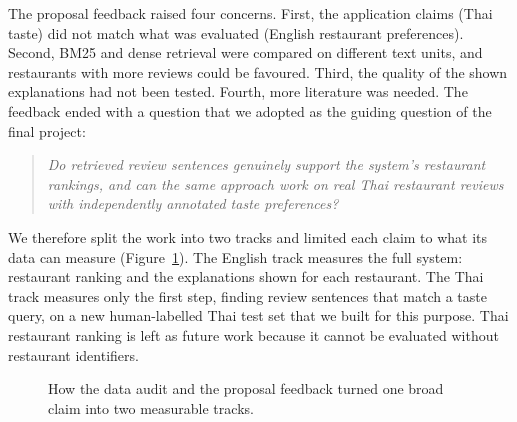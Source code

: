The proposal feedback raised four concerns. First, the application claims (Thai taste) did not
match what was evaluated (English restaurant preferences). Second, BM25 and dense retrieval
were compared on different text units, and restaurants with more reviews could be favoured.
Third, the quality of the shown explanations had not been tested. Fourth, more literature was
needed. The feedback ended with a question that we adopted as the guiding question of the final
project:
\begin{quote}
\emph{Do retrieved review sentences genuinely support the system's restaurant rankings, and can
the same approach work on real Thai restaurant reviews with independently annotated taste
preferences?}
\end{quote}

We therefore split the work into two tracks and limited each claim to what its data can
measure (Figure~\ref{fig:intro-scope}). The English track measures the full system: restaurant
ranking and the explanations shown for each restaurant. The Thai track measures only the first
step, finding review sentences that match a taste query, on a new human-labelled Thai test set
that we built for this purpose. Thai restaurant ranking is left as future work because it
cannot be evaluated without restaurant identifiers.

\begin{figure}[H]
\centering
{}
\caption{How the data audit and the proposal feedback turned one broad claim into two
measurable tracks.}
\label{fig:intro-scope}
\end{figure}

